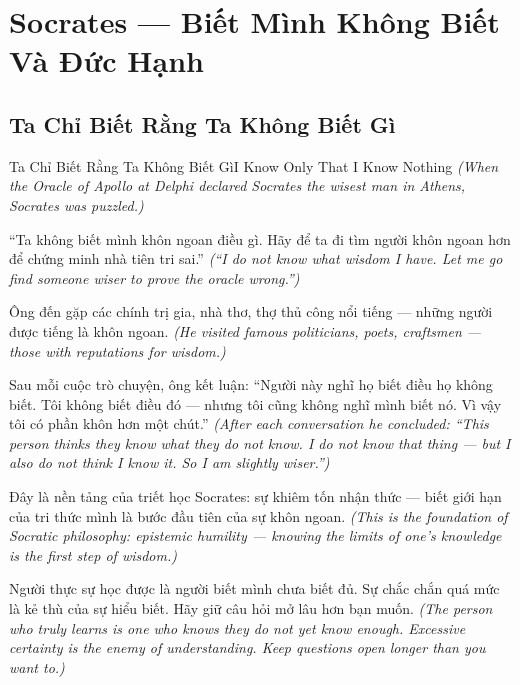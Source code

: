 \chapter{Socrates — Biết Mình Không Biết Và Đức Hạnh}

\section{Ta Chỉ Biết Rằng Ta Không Biết Gì}
\begin{truyen}{Ta Chỉ Biết Rằng Ta Không Biết Gì}{I Know Only That I Know Nothing}
\textit{(When the Oracle of Apollo at Delphi declared Socrates the wisest man in Athens, Socrates was puzzled.)}

``Ta không biết mình khôn ngoan điều gì. Hãy để ta đi tìm người khôn ngoan hơn để chứng minh nhà tiên tri sai.''
\textit{(``I do not know what wisdom I have. Let me go find someone wiser to prove the oracle wrong.'')}

Ông đến gặp các chính trị gia, nhà thơ, thợ thủ công nổi tiếng — những người được tiếng là khôn ngoan.
\textit{(He visited famous politicians, poets, craftsmen — those with reputations for wisdom.)}

Sau mỗi cuộc trò chuyện, ông kết luận: ``Người này nghĩ họ biết điều họ không biết. Tôi không biết điều đó — nhưng tôi cũng không nghĩ mình biết nó. Vì vậy tôi có phần khôn hơn một chút.''
\textit{(After each conversation he concluded: ``This person thinks they know what they do not know. I do not know that thing — but I also do not think I know it. So I am slightly wiser.'')}

Đây là nền tảng của triết học Socrates: sự khiêm tốn nhận thức — biết giới hạn của tri thức mình là bước đầu tiên của sự khôn ngoan.
\textit{(This is the foundation of Socratic philosophy: epistemic humility — knowing the limits of one's knowledge is the first step of wisdom.)}

\end{truyen}

\begin{baihoc}
Người thực sự học được là người biết mình chưa biết đủ. Sự chắc chắn quá mức là kẻ thù của sự hiểu biết. Hãy giữ câu hỏi mở lâu hơn bạn muốn.
\textit{(The person who truly learns is one who knows they do not yet know enough. Excessive certainty is the enemy of understanding. Keep questions open longer than you want to.)}
\end{baihoc}
\ngancach

